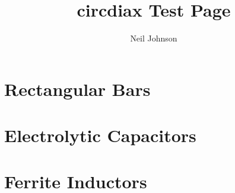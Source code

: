 \documentclass[11pt]{article}
\title{circdiax Test Page}
\author{Neil Johnson}
\begin{document}
\maketitle


\section{Rectangular Bars}

\begin{circuitdiagram}[]{37}{25}
\circledtrans
\filleddiode







\end{circuitdiagram}


\section{Electrolytic Capacitors}

\begin{circuitdiagram}[]{33}{10}


\end{circuitdiagram}


\section{Ferrite Inductors}

\begin{circuitdiagram}[]{20}{20}


\end{circuitdiagram}
\end{document}
